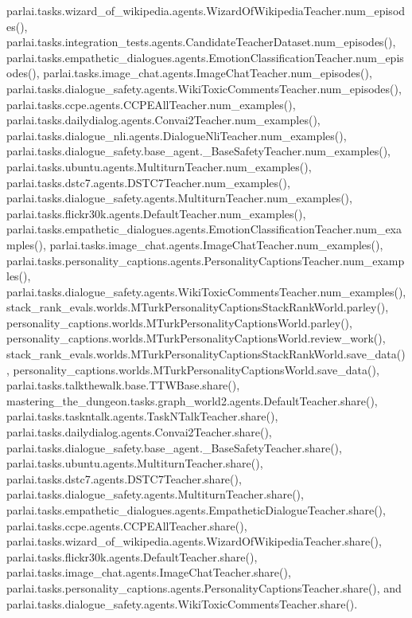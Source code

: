 parlai.\+tasks.\+wizard\+\_\+of\+\_\+wikipedia.\+agents.\+Wizard\+Of\+Wikipedia\+Teacher.\+num\+\_\+episodes(), parlai.\+tasks.\+integration\+\_\+tests.\+agents.\+Candidate\+Teacher\+Dataset.\+num\+\_\+episodes(), parlai.\+tasks.\+empathetic\+\_\+dialogues.\+agents.\+Emotion\+Classification\+Teacher.\+num\+\_\+episodes(), parlai.\+tasks.\+image\+\_\+chat.\+agents.\+Image\+Chat\+Teacher.\+num\+\_\+episodes(), parlai.\+tasks.\+dialogue\+\_\+safety.\+agents.\+Wiki\+Toxic\+Comments\+Teacher.\+num\+\_\+episodes(), parlai.\+tasks.\+ccpe.\+agents.\+C\+C\+P\+E\+All\+Teacher.\+num\+\_\+examples(), parlai.\+tasks.\+dailydialog.\+agents.\+Convai2\+Teacher.\+num\+\_\+examples(), parlai.\+tasks.\+dialogue\+\_\+nli.\+agents.\+Dialogue\+Nli\+Teacher.\+num\+\_\+examples(), parlai.\+tasks.\+dialogue\+\_\+safety.\+base\+\_\+agent.\+\_\+\+Base\+Safety\+Teacher.\+num\+\_\+examples(), parlai.\+tasks.\+ubuntu.\+agents.\+Multiturn\+Teacher.\+num\+\_\+examples(), parlai.\+tasks.\+dstc7.\+agents.\+D\+S\+T\+C7\+Teacher.\+num\+\_\+examples(), parlai.\+tasks.\+dialogue\+\_\+safety.\+agents.\+Multiturn\+Teacher.\+num\+\_\+examples(), parlai.\+tasks.\+flickr30k.\+agents.\+Default\+Teacher.\+num\+\_\+examples(), parlai.\+tasks.\+empathetic\+\_\+dialogues.\+agents.\+Emotion\+Classification\+Teacher.\+num\+\_\+examples(), parlai.\+tasks.\+image\+\_\+chat.\+agents.\+Image\+Chat\+Teacher.\+num\+\_\+examples(), parlai.\+tasks.\+personality\+\_\+captions.\+agents.\+Personality\+Captions\+Teacher.\+num\+\_\+examples(), parlai.\+tasks.\+dialogue\+\_\+safety.\+agents.\+Wiki\+Toxic\+Comments\+Teacher.\+num\+\_\+examples(), stack\+\_\+rank\+\_\+evals.\+worlds.\+M\+Turk\+Personality\+Captions\+Stack\+Rank\+World.\+parley(), personality\+\_\+captions.\+worlds.\+M\+Turk\+Personality\+Captions\+World.\+parley(), personality\+\_\+captions.\+worlds.\+M\+Turk\+Personality\+Captions\+World.\+review\+\_\+work(), stack\+\_\+rank\+\_\+evals.\+worlds.\+M\+Turk\+Personality\+Captions\+Stack\+Rank\+World.\+save\+\_\+data(), personality\+\_\+captions.\+worlds.\+M\+Turk\+Personality\+Captions\+World.\+save\+\_\+data(), parlai.\+tasks.\+talkthewalk.\+base.\+T\+T\+W\+Base.\+share(), mastering\+\_\+the\+\_\+dungeon.\+tasks.\+graph\+\_\+world2.\+agents.\+Default\+Teacher.\+share(), parlai.\+tasks.\+taskntalk.\+agents.\+Task\+N\+Talk\+Teacher.\+share(), parlai.\+tasks.\+dailydialog.\+agents.\+Convai2\+Teacher.\+share(), parlai.\+tasks.\+dialogue\+\_\+safety.\+base\+\_\+agent.\+\_\+\+Base\+Safety\+Teacher.\+share(), parlai.\+tasks.\+ubuntu.\+agents.\+Multiturn\+Teacher.\+share(), parlai.\+tasks.\+dstc7.\+agents.\+D\+S\+T\+C7\+Teacher.\+share(), parlai.\+tasks.\+dialogue\+\_\+safety.\+agents.\+Multiturn\+Teacher.\+share(), parlai.\+tasks.\+empathetic\+\_\+dialogues.\+agents.\+Empathetic\+Dialogue\+Teacher.\+share(), parlai.\+tasks.\+ccpe.\+agents.\+C\+C\+P\+E\+All\+Teacher.\+share(), parlai.\+tasks.\+wizard\+\_\+of\+\_\+wikipedia.\+agents.\+Wizard\+Of\+Wikipedia\+Teacher.\+share(), parlai.\+tasks.\+flickr30k.\+agents.\+Default\+Teacher.\+share(), parlai.\+tasks.\+image\+\_\+chat.\+agents.\+Image\+Chat\+Teacher.\+share(), parlai.\+tasks.\+personality\+\_\+captions.\+agents.\+Personality\+Captions\+Teacher.\+share(), and parlai.\+tasks.\+dialogue\+\_\+safety.\+agents.\+Wiki\+Toxic\+Comments\+Teacher.\+share().

